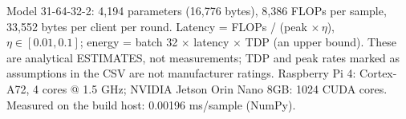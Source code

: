 \begin{table}[t]
\caption{Edge cost of one local inference pass, computed from the trained model.}
\label{tab:edge}
\centering
\small
\setlength{\tabcolsep}{3pt}
\par\smallskip
{\footnotesize Model 31-64-32-2: 4,194 parameters (16,776 bytes), 8,386 FLOPs per sample, 33,552 bytes per client per round. Latency = FLOPs / (peak $\times\,\eta$), $\eta\in[0.01,0.1]$; energy = batch 32 $\times$ latency $\times$ TDP (an upper bound). These are analytical ESTIMATES, not measurements; TDP and peak rates marked as assumptions in the CSV are not manufacturer ratings. Raspberry Pi 4: Cortex-A72, 4 cores @ 1.5 GHz; NVIDIA Jetson Orin Nano 8GB: 1024 CUDA cores. Measured on the build host: 0.00196 ms/sample (NumPy).}
\end{table}

